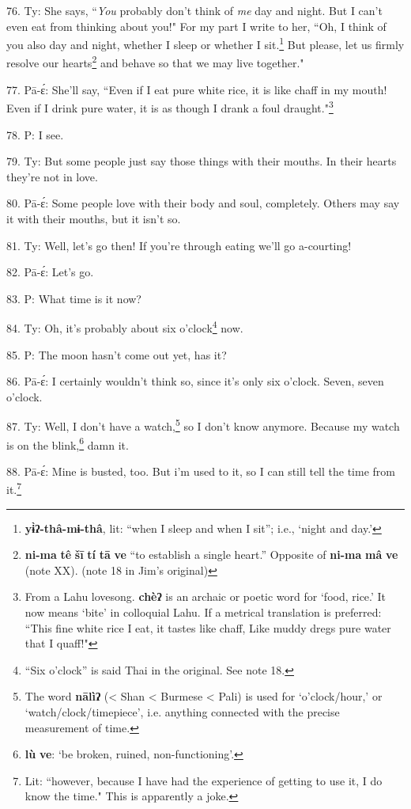 76. Ty: She says, ``\textit{You} probably don't think of \textit{me}
day and night. But I can't even eat from thinking about you!" For my part
I write to her, ``Oh, I think of you also day and night, whether I sleep
or whether I sit.\footnote{\textbf{yɨ̀ʔ-thâ-mɨ-thâ}, lit: ``when I sleep and when I sit''; i.e., `night and day.'} But please, let us firmly resolve our hearts\footnote{\textbf{ni-ma} \textbf{tê} \textbf{šī} \textbf{tí} \textbf{tā} \textbf{ve} ``to establish a single heart.'' Opposite of \textbf{ni-ma} \textbf{mâ} \textbf{ve} (note XX). (note 18 in Jim's original)} and behave
so that we may live together."

77. Pā-ɛ́: She'll say, ``Even if I eat pure white rice, it is like chaff
in my mouth! Even if I drink pure water, it is as though I drank a foul draught."\footnote{From a Lahu lovesong. \textbf{chèʔ} is an archaic or poetic word for `food, rice.' It now means `bite' in colloquial Lahu. If a metrical translation is preferred: ``This fine white rice I eat, it tastes like chaff, Like muddy dregs pure water that I quaff!"}

78. P: I see.

79. Ty: But some people just say those things with their mouths. In their
hearts they're not in love.

80. Pā-ɛ́: Some people love with their body and soul, completely. Others may
say it with their mouths, but it isn't so.

81. Ty: Well, let's go then! If you're through eating we'll go a-courting!

82. Pā-ɛ́: Let's go.

83. P: What time is it now?

84. Ty: Oh, it's probably about\textit{ }six o'clock\footnote{``Six o'clock'' is said Thai in the original. See note 18.} now.

85. P: The moon hasn't come out yet, has it?

86. Pā-ɛ́: I certainly wouldn't think so, since it's only six o'clock. Seven,
seven o'clock.

87. Ty: Well, I don't have a watch,\footnote{The word \textbf{nālìʔ} (< Shan < Burmese < Pali) is used for `o'clock/hour,' or `watch/clock/timepiece', i.e. anything connected with the precise measurement of time.} so I don't know anymore. Because my
watch is on the blink,\footnote{\textbf{lù} \textbf{ve}: `be broken, ruined, non-functioning'.} damn it.

88. Pā-ɛ́: Mine is busted, too. But i'm used to it, so I can still tell the
time from it.\footnote{Lit: ``however, because I have had the experience of getting to use it, I do know the time." This is apparently a joke.}

